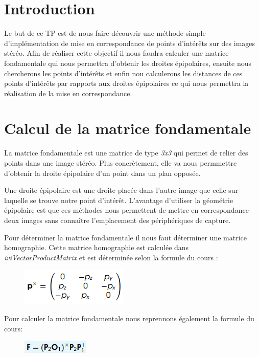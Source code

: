 \documentclass[a4paper,12pt]{report}
\begin{document}


\setcounter{page}{1} 
\newpage

\section*{Introduction}

Le but de ce TP est de nous faire découvrir une méthode simple d'implémentation de mise en correspondance de points d'intérêts sur des images stéréo. Afin de réaliser cette objectif il nous faudra calculer une matrice fondamentale qui nous permettra d'obtenir les droites épipolaires, ensuite nous chercherons les points d'intérêts et enfin nou calculerons les distances de ces points d'intérêts par rapports aux droites épipolaires ce qui nous permettra la réalisation de la mise en correspondance.


\section*{Calcul de la matrice fondamentale}

La matrice fondamentale est une matrice de type \textit{3x3} qui permet de relier des points dans une image stéréo. Plus concrètement, elle va nous permmettre d'obtenir la droite épipolaire d'un point dans un plan opposée.

Une droite épipolaire est une droite placée dans l'autre image que celle sur laquelle se trouve notre point d'intérêt. L'avantage d'utiliser la géométrie épipolaire est que ces méthodes nous permettent de mettre en correspondance deux images sans connaître l'emplacement des périphériques de capture. 

Pour déterminer la matrice fondamentale il nous faut déterminer une matrice homographie. Cette matrice homographie est calculée dans \textit{iviVectorProductMatrix} et est déterminée selon la formule du cours :

\begin{figure}[!ht]
	\center
	\includegraphics[scale=0.6]{./image/vector.png}
\end{figure}

Pour calculer la matrice fondamentale nous reprennons également la formule du cours: 

\begin{figure}[!ht]
	\center
	\includegraphics[scale=0.7]{./image/funda.png}
\end{figure}
\end{document}
